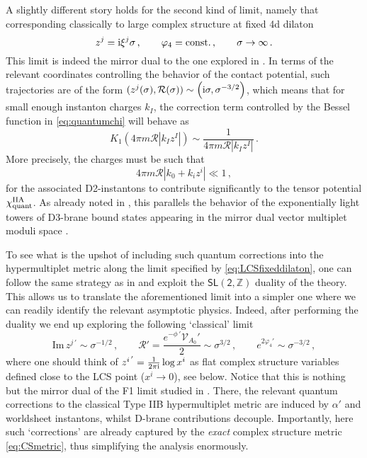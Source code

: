 A slightly different story holds for the second kind of limit, namely that corresponding classically to large complex structure at fixed 4d dilaton
%
\begin{equation}\label{eq:LCSfixeddilaton}
	z^j ={\rm i} \xi^j \sigma\, , \qquad \varphi_4= \text{const.}\, , \qquad \sigma \to \infty\, .
	\end{equation}
%
This limit is indeed the mirror dual to the one explored in \cite{Marchesano:2019ifh,Baume:2019sry}. In terms of the relevant coordinates controlling the behavior of the contact potential, such trajectories are of the form $(z^j (\sigma), \mathcal{R} (\sigma)) \sim \left( {\rm i} \sigma, \sigma^{-3/2}\right)$, which means that for small enough instanton charges $k_I$, the correction term controlled by the Bessel function in \eqref{eq:quantumchi} will behave as 
%
\begin{equation}\label{eq:strongorrections}
	K_1 \left( 4\pi m \mathcal{R}|k_I z^I|\right) \sim\frac{1}{4\pi m \mathcal{R}|k_I z^I|}\, .
\end{equation}
%
More precisely, the charges must be such that
%
\begin{equation}\label{eq:instantoncondition}
	4\pi m \mathcal{R}|k_0 + k_i z^i| \ll 1\, ,
\end{equation}
%
for the associated D2-instantons to contribute significantly to the tensor potential $\chi^{\rm IIA}_{\text{quant}}$. As already noted in \cite{Marchesano:2019ifh}, this parallels the behavior of the exponentially light towers of D3-brane bound states appearing in the mirror dual vector multiplet moduli space \cite{Grimm:2018ohb}.%
	
To see what is the upshot of including such quantum corrections into the hypermultiplet metric along the limit specified by \eqref{eq:LCSfixeddilaton}, one can follow the same strategy as in \cite{Baume:2019sry} and exploit the $\mathsf{SL(2, \mathbb{Z})}$ duality of the theory. This allows us to translate the aforementioned limit into a simpler one where we can readily identify the relevant asymptotic physics. Indeed, after performing the duality we end up exploring the following `classical' limit
%
\begin{equation}\label{eq:smallCSsmalldilaton}
	\text{Im}\, z^{j\, '} \sim \sigma^{-1/2}\, , \qquad \mathcal{R}' = \frac{e^{-\phi\, '} \mathcal{V}_{A_0}'}{2} \sim \sigma^{3/2}\, , \qquad e^{2\varphi_4'} \sim \sigma^{-3/2}\, ,
\end{equation}
%
where one should think of $z^{i\, '}= \frac{1}{2\pi {\rm i}} \log x^i$ as flat complex structure variables defined close to the LCS point ($x^i \to 0$), see below. Notice that this is nothing but the mirror dual of the F1 limit studied in \cite{Baume:2019sry}. There, the relevant quantum corrections to the classical Type IIB hypermultiplet metric are induced by $\alpha'$ and worldsheet instantons, whilst D-brane contributions decouple. Importantly, here such `corrections' are already captured by the \emph{exact} complex structure metric \eqref{eq:CSmetric}, thus simplifying the analysis enormously.
	

